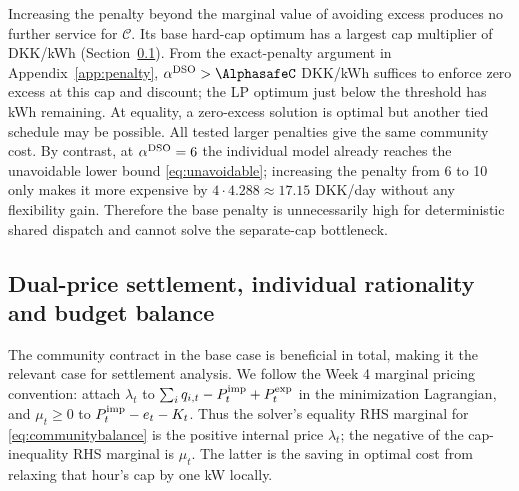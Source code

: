 \documentclass[10pt,a4paper]{article}
\newcommand{\Cmod}{\mathcal C}
\begin{document}
Increasing the penalty beyond the marginal value of avoiding excess produces no further service for $\Cmod$. Its base hard-cap optimum has a largest cap multiplier of \MaxtieMu{} DKK/kWh (Section~\ref{sec:settle}). From the exact-penalty argument in Appendix~\ref{app:penalty}, $\alpha^{\rm DSO}>\AlphasafeC$ DKK/kWh suffices to enforce zero excess at this cap and discount; the LP optimum just below the threshold has \CBeforeExactEx{} kWh remaining. At equality, a zero-excess solution is optimal but another tied schedule may be possible. All tested larger penalties give the same community cost. By contrast, at $\alpha^{\rm DSO}=6$ the individual model already reaches the unavoidable lower bound \eqref{eq:unavoidable}; increasing the penalty from 6 to 10 only makes it more expensive by $4\cdot4.288\approx17.15$ DKK/day without any flexibility gain. Therefore the base penalty is unnecessarily high for deterministic shared dispatch and cannot solve the separate-cap bottleneck.

\subsection{Dual-price settlement, individual rationality and budget balance}
\label{sec:settle}
The community contract in the base case is beneficial in total, making it the relevant case for settlement analysis. We follow the Week 4 marginal pricing convention: attach $\lambda_t$ to $\sum_i q_{i,t}-P_t^{\rm imp}+P_t^{\rm exp}$ in the minimization Lagrangian, and $\mu_t\ge0$ to $P_t^{\rm imp}-e_t-K_t$. Thus the solver's equality RHS marginal for \eqref{eq:communitybalance} is the positive internal price $\lambda_t$; the negative of the cap-inequality RHS marginal is $\mu_t$. The latter is the saving in optimal cost from relaxing that hour's cap by one kW locally.
\end{document}
